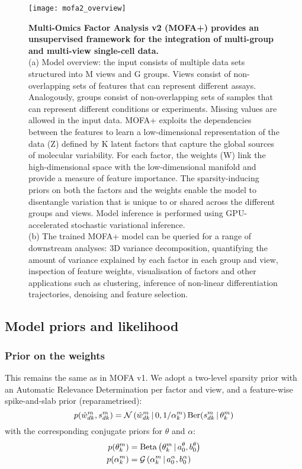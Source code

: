\begin{figure}[H]
	\centering
	\texttt{[image: mofa2\_overview]}
	\caption[]{\textbf{Multi-Omics Factor Analysis v2 (MOFA+) provides an unsupervised framework for the integration of multi-group and multi-view single-cell data.}\\
	(a) Model overview: the input consists of multiple data sets structured into M views and G groups. Views consist of non-overlapping sets of features that can represent different assays. Analogously, groups consist of non-overlapping sets of samples that can represent different conditions or experiments. Missing values are allowed in the input data. MOFA+ exploits the dependencies between the features to learn a low-dimensional representation of the data (Z) defined by K latent factors that capture the global sources of molecular variability. For each factor, the weights (W) link the high-dimensional space with the low-dimensional manifold and provide a measure of feature importance. The sparsity-inducing priors on both the factors and the weights enable the model to disentangle variation that is unique to or shared across the different groups and views. Model inference is performed using GPU-accelerated stochastic variational inference. \\
	(b) The trained MOFA+ model can be queried for a range of downstream analyses: 3D variance decomposition, quantifying the amount of variance explained by each factor in each group and view, inspection of feature weights, visualisation of factors and other applications such as clustering, inference of non-linear differentiation trajectories, denoising and feature selection.
	}
	\label{fig:mofa2_overview}
\end{figure}


\subsection{Model priors and likelihood}

\subsubsection{Prior on the weights}

This remains the same as in MOFA v1. We adopt a two-level sparsity prior with an Automatic Relevance Determination per factor and view, and a feature-wise spike-and-slab prior (reparametrised\cite{Titsias2011}):
\begin{equation}
	p(\hat{w}_{dk}^m,s_{dk}^m) = \mathcal{N}\left(\hat{w}_{dk}^{m} \,|\, 0, 1/\alpha_{k}^{m}\right)  \text{Ber}(s_{dk}^{m} \,|\,\theta_{k}^{m})
\end{equation}
with the corresponding conjugate priors for $\theta$ and $\alpha$:
\begin{align}
	p(\theta_k^m) &= \text{Beta}\left(\theta_k^m \,|\, a_0^\theta,b_0^\theta\right)\\
	p(\alpha_k^m) &= \mathcal{G}\left(\alpha_k^m \,|\, a_0^\alpha, b_0^\alpha\right)
\end{align}

